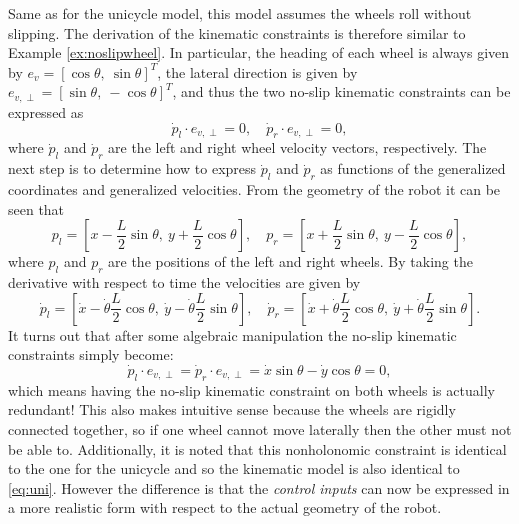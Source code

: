 Same as for the unicycle model, this model assumes the wheels roll without slipping. The derivation of the kinematic constraints is therefore similar to Example \ref{ex:noslipwheel}. In particular, the heading of each wheel is always given by $e_v = [\cos \theta, \: \sin \theta]^T$, the lateral direction is given by $e_{v,\perp} = [\sin \theta, \: -\cos \theta]^T$, and thus the two no-slip kinematic constraints can be expressed as
\begin{equation*}
\dot{p}_l \cdot e_{v,\perp} = 0, \quad \dot{p}_r \cdot e_{v,\perp} = 0,
\end{equation*}
where $\dot{p}_l$ and $\dot{p}_r$ are the left and right wheel velocity vectors, respectively. The next step is to determine how to express $\dot{p}_l$ and $\dot{p}_r$ as functions of the generalized coordinates and generalized velocities. From the geometry of the robot it can be seen that
\begin{equation*}
p_l = [x - \frac{L}{2}\sin \theta, \: y + \frac{L}{2}\cos \theta], \quad p_r = [x + \frac{L}{2}\sin \theta, \: y - \frac{L}{2}\cos \theta],
\end{equation*}
where $p_l$ and $p_r$ are the positions of the left and right wheels. By taking the derivative with respect to time the velocities are given by
\begin{equation*}
\dot{p}_l = [\dot{x} - \dot{\theta}\frac{L}{2}\cos \theta, \: \dot{y} - \dot{\theta}\frac{L}{2}\sin \theta], \quad \dot{p}_r = [\dot{x} + \dot{\theta}\frac{L}{2}\cos \theta, \: \dot{y} + \dot{\theta}\frac{L}{2}\sin \theta].
\end{equation*}
It turns out that after some algebraic manipulation the no-slip kinematic constraints simply become:
\begin{equation*}
\dot{p}_l \cdot e_{v,\perp} = \dot{p}_r \cdot e_{v,\perp} = \dot{x}\sin \theta - \dot{y} \cos \theta = 0,
\end{equation*}
which means having the no-slip kinematic constraint on both wheels is actually redundant! This also makes intuitive sense because the wheels are rigidly connected together, so if one wheel cannot move laterally then the other must not be able to. Additionally, it is noted that this nonholonomic constraint is identical to the one for the unicycle and so the kinematic model is also identical to \eqref{eq:uni}. However the difference is that the \textit{control inputs} can now be expressed in a more realistic form with respect to the actual geometry of the robot.

